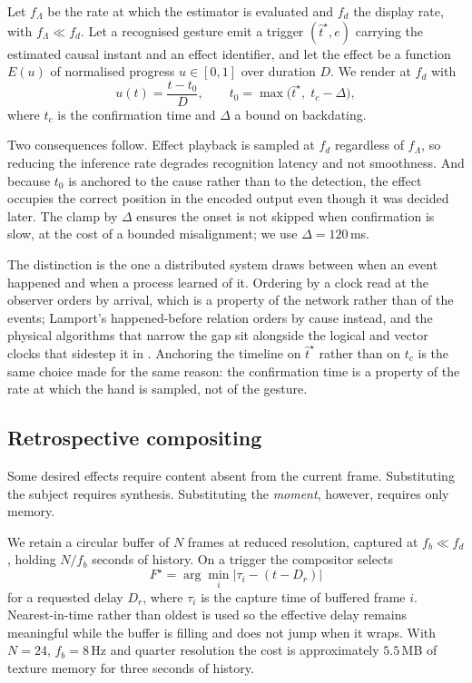 \documentclass{article}
\theoremstyle{definition}
\begin{document}
Let $f_\Lambda$ be the rate at which the estimator is evaluated and $f_d$ the
display rate, with $f_\Lambda \ll f_d$. Let a recognised gesture emit a trigger
$(\hat{t}^\star, e)$ carrying the estimated causal instant and an effect
identifier, and let the effect be a function $E(u)$ of normalised progress
$u \in [0, 1]$ over duration $D$. We render at $f_d$ with
\begin{equation}
  u(t) = \frac{t - t_0}{D},
  \qquad
  t_0 = \max\big(\hat{t}^\star,\; t_c - \Delta\big),
  \label{eq:timeline}
\end{equation}
where $t_c$ is the confirmation time and $\Delta$ a bound on backdating.

Two consequences follow. Effect playback is sampled at $f_d$ regardless of
$f_\Lambda$, so reducing the inference rate degrades recognition latency and not
smoothness. And because $t_0$ is anchored to the cause rather than to the
detection, the effect occupies the correct position in the encoded output even
though it was decided later. The clamp by $\Delta$ ensures the onset is not
skipped when confirmation is slow, at the cost of a bounded misalignment; we use
$\Delta = 120$\,ms.

The distinction is the one a distributed system draws between when an event
happened and when a process learned of it. Ordering by a clock read at the
observer orders by arrival, which is a property of the network rather than of the
events; Lamport's happened-before relation orders by cause instead, and the
physical algorithms that narrow the gap sit alongside the logical and vector
clocks that sidestep it in \citet{thakur2022clocksync}. Anchoring the timeline on
$\hat{t}^\star$ rather than on $t_c$ is the same choice made for the same reason:
the confirmation time is a property of the rate at which the hand is sampled, not
of the gesture.

\subsection{Retrospective compositing}
\label{sec:rewind}

Some desired effects require content absent from the current frame. Substituting
the subject requires synthesis. Substituting the \emph{moment}, however, requires
only memory.

We retain a circular buffer of $N$ frames at reduced resolution, captured at
$f_b \ll f_d$, holding $N / f_b$ seconds of history. On a trigger the compositor
selects
\begin{equation}
  F^\star = \arg\min_{i} \big| \tau_i - (t - D_r) \big|
\end{equation}
for a requested delay $D_r$, where $\tau_i$ is the capture time of buffered frame
$i$. Nearest-in-time rather than oldest is used so the effective delay remains
meaningful while the buffer is filling and does not jump when it wraps. With
$N = 24$, $f_b = 8$\,Hz and quarter resolution the cost is approximately
$5.5$\,MB of texture memory for three seconds of history.
\end{document}
